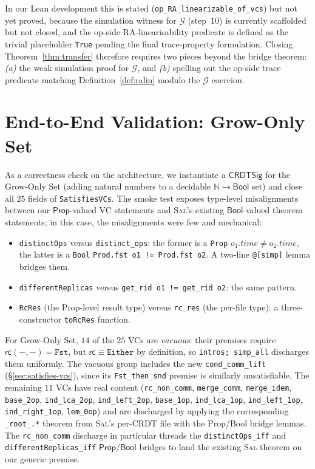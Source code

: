 \documentclass[11pt,a4paper]{article}
\theoremstyle{definition}
\theoremstyle{remark}
\newcommand{\mrc}{\mathsf{rc}}
\newcommand{\Either}{\mathtt{Either}}
\newcommand{\Fst}{\mathtt{Fst}}
\newcommand{\Sal}{\textsc{Sal}}
\newcommand{\Emul}{\mathcal{G}}
\begin{document}
In our Lean development this is stated
(\texttt{op\_RA\_linearizable\_of\_vcs}) but not yet proved, because
the simulation witness for $\Emul$ (step~10) is currently scaffolded
but not closed, and the op-side RA-linearisability predicate is
defined as the trivial placeholder \texttt{True} pending the
final trace-property formulation. Closing Theorem~\ref{thm:transfer}
therefore requires two pieces beyond the bridge theorem:
\emph{(a)} the weak simulation proof for $\Emul$, and \emph{(b)}
spelling out the op-side trace predicate matching
Definition~\ref{def:ralin} modulo the $\Emul$ coercion.

\section{End-to-End Validation: Grow-Only Set}
\label{sec:smoke-test}

As a correctness check on the architecture, we instantiate a
$\mathsf{CRDTSig}$ for the Grow-Only Set (adding natural numbers to
a decidable $\mathbb{N} \to \mathsf{Bool}$ set) and close all $25$
fields of \texttt{SatisfiesVCs}. The smoke test exposes type-level
misalignments between our $\mathsf{Prop}$-valued VC statements and
\Sal{}'s existing $\mathsf{Bool}$-valued theorem statements; in this
case, the misalignments were few and mechanical:
\begin{itemize}[leftmargin=*]
  \item \texttt{distinctOps} versus \texttt{distinct\_ops}: the
    former is a \texttt{Prop} $o_1.\mathit{time} \neq o_2.\mathit{time}$,
    the latter is a \texttt{Bool} \texttt{Prod.fst o1 != Prod.fst o2}.
    A two-line \texttt{@[simp]} lemma bridges them.
  \item \texttt{differentReplicas} versus \texttt{get\_rid o1 != get\_rid o2}:
    the same pattern.
  \item \texttt{RcRes} (the Prop-level result type) versus
    \texttt{rc\_res} (the per-file type): a three-constructor
    \texttt{toRcRes} function.
\end{itemize}

For Grow-Only Set, $14$ of the $25$ VCs are \emph{vacuous}: their
premises require $\mrc(-, -) = \Fst$, but $\mrc \equiv \Either$ by
definition, so \texttt{intros; simp\_all} discharges them
uniformly. The vacuous group includes the new
\texttt{cond\_comm\_lift} (\S\ref{sec:satisfies-vcs}), since its
\texttt{Fst\_then\_snd} premise is similarly unsatisfiable. The
remaining $11$ VCs have real content
(\texttt{rc\_non\_comm},
\texttt{merge\_comm}, \texttt{merge\_idem}, \texttt{base\_2op},
\texttt{ind\_lca\_2op}, \texttt{ind\_left\_2op}, \texttt{base\_1op},
\texttt{ind\_lca\_1op}, \texttt{ind\_left\_1op},
\texttt{ind\_right\_1op}, \texttt{lem\_0op}) and are discharged by
applying the corresponding \texttt{\_root\_.*} theorem from \Sal{}'s
per-CRDT file with the Prop/Bool bridge lemmas. The
\texttt{rc\_non\_comm} discharge in particular threads the
\texttt{distinctOps\_iff} and \texttt{differentReplicas\_iff}
$\mathsf{Prop}/\mathsf{Bool}$ bridges to land the existing \Sal{}
theorem on our generic premise.
\end{document}
